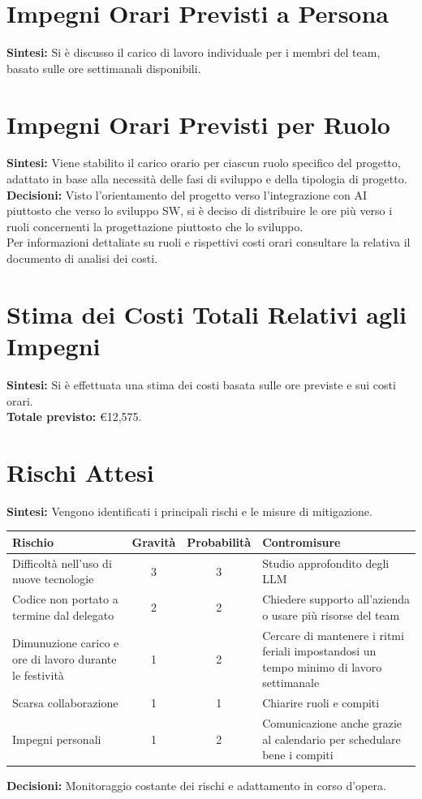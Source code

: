 \documentclass{article}
\begin{document}
\section{Impegni Orari Previsti a Persona}
\textbf{Sintesi:} Si è discusso il carico di lavoro individuale per i membri del team, basato sulle ore settimanali disponibili.

\section{Impegni Orari Previsti per Ruolo}
\textbf{Sintesi:} Viene stabilito il carico orario per ciascun ruolo specifico del progetto, adattato in base alla necessità delle fasi di sviluppo e della tipologia di progetto. \\
\textbf{Decisioni:} Visto l'orientamento del progetto verso l'integrazione con AI piuttosto che verso lo sviluppo SW, si è deciso di distribuire le ore più verso i ruoli concernenti la progettazione piuttosto che lo sviluppo.\\Per informazioni dettaliate su ruoli e rispettivi costi orari consultare la relativa il documento di analisi dei costi.

\section{Stima dei Costi Totali Relativi agli Impegni}
\textbf{Sintesi:} Si è effettuata una stima dei costi basata sulle ore previste e sui costi orari. \\
\textbf{Totale previsto:} €12,575. 

\section{Rischi Attesi}
\textbf{Sintesi:} Vengono identificati i principali rischi e le misure di mitigazione.

\begin{table}[h]
\centering
\begin{tabularx}{\textwidth}{|X|c|c|X|}
    \hline
    \textbf{Rischio} & \textbf{Gravità} & \textbf{Probabilità}& \textbf{Contromisure}\\
    \hline
    Difficoltà nell'uso di nuove tecnologie & 3& 3 & Studio approfondito degli LLM \\ 
    \hline
    Codice non portato a termine dal delegato & 2 & 2 & Chiedere supporto all'azienda o usare più risorse del team\\ 
    \hline
    Dimunuzione carico e ore di lavoro durante le festività & 1 & 2 & Cercare di mantenere i ritmi feriali impostandosi un tempo minimo di lavoro settimanale\\ 
    \hline 
    Scarsa collaborazione & 1& 1 & Chiarire ruoli e compiti \\ 
    \hline
    Impegni personali & 1 & 2 & Comunicazione anche grazie al calendario per schedulare bene i compiti\\ 
    \hline 
\end{tabularx}
\end{table}
\textbf{Decisioni:} Monitoraggio costante dei rischi e adattamento in corso d’opera.
\end{document}

